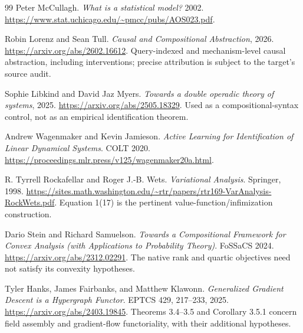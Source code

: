 \documentclass[11pt]{article}
\theoremstyle{remark}
\begin{document}
\begin{thebibliography}{99}
Peter McCullagh. \emph{What is a statistical model?} 2002.
\url{https://www.stat.uchicago.edu/~pmcc/pubs/AOS023.pdf}.

Robin Lorenz and Sean Tull. \emph{Causal and Compositional Abstraction}, 2026.
\url{https://arxiv.org/abs/2602.16612}.
Query-indexed and mechanism-level causal abstraction, including interventions; precise attribution is subject to the target's source audit.

Sophie Libkind and David Jaz Myers. \emph{Towards a double operadic theory of systems}, 2025.
\url{https://arxiv.org/abs/2505.18329}.
Used as a compositional-syntax control, not as an empirical identification theorem.

Andrew Wagenmaker and Kevin Jamieson.
\emph{Active Learning for Identification of Linear Dynamical Systems}.
COLT 2020.
\url{https://proceedings.mlr.press/v125/wagenmaker20a.html}.

R. Tyrrell Rockafellar and Roger J.-B. Wets.
\emph{Variational Analysis}. Springer, 1998.
\url{https://sites.math.washington.edu/~rtr/papers/rtr169-VarAnalysis-RockWets.pdf}.
Equation 1(17) is the pertinent value-function/infimization construction.

Dario Stein and Richard Samuelson.
\emph{Towards a Compositional Framework for Convex Analysis (with Applications to Probability Theory)}.
FoSSaCS 2024.
\url{https://arxiv.org/abs/2312.02291}.
The native rank and quartic objectives need not satisfy its convexity hypotheses.

Tyler Hanks, James Fairbanks, and Matthew Klawonn.
\emph{Generalized Gradient Descent is a Hypergraph Functor}.
EPTCS 429, 217--233, 2025.
\url{https://arxiv.org/abs/2403.19845}.
Theorems 3.4--3.5 and Corollary 3.5.1 concern field assembly and gradient-flow functoriality, with their additional hypotheses.
\end{thebibliography}
\end{document}
